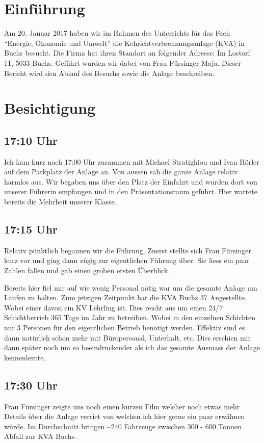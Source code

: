 \section{Einführung}
\label{sec-1}
Am 20. Januar 2017 haben wir im Rahmen des Unterrichts für das Fach
``Energie, Ökonomie und Umwelt'' die Kehrichtverbrennungsanlage (KVA) in
Buchs besucht. Die Firma hat ihren Standort an folgender Adresse: Im
Lostorf 11, 5033 Buchs.  Geführt wurden wir dabei von Frau Fürsinger
Maja.  Dieser Bericht wird den Ablauf des Besuchs sowie die Anlage
beschreiben.


\section{Besichtigung}
\label{sec-2}
\subsection{17:10 Uhr}
\label{sec-2-1}
Ich kam kurz nach 17:00 Uhr zusammen mit Michael Stratighiou und Ivan
Hörler auf dem Parkplatz der Anlage an. Von aussen sah die ganze
Anlage relativ harmlos aus. Wir begaben uns über den Platz der
Einfahrt und wurden dort von unserer Führerin empfangen und in den
Präsentationsraum geführt. Hier wartete bereits die Mehrheit unserer
Klasse.

\subsection{17:15 Uhr}
\label{sec-2-2}
Relativ pünktlich begannen wir die Führung. Zuerst stellte sich Frau
Fürsinger kurz vor und ging dann zügig zur eigentlichen Führung über.
Sie liess ein paar Zahlen fallen und gab einen groben ersten Überblick.

Bereits hier fiel mir auf wie wenig Personal nötig war um die gesamte
Anlage am Laufen zu halten. Zum jetzigen Zeitpunkt hat die KVA Buchs
37 Angestellte. Wobei einer davon ein KV Lehrling ist. Dies reicht aus
um einen 24/7 Schichtbetrieb 365 Tage im Jahr zu betreiben. Wobei in
den einzelnen Schichten nur 3 Personen für den eigentlichen Betrieb
benötigt werden. Effektiv sind es dann natürlich schon mehr mit
Büropersonal, Unterhalt, etc. Dies erschien mir dann später noch um so
beeindruckender als ich das gesamte Ausmass der Anlage kennenlernte.

\subsection{17:30 Uhr}
\label{sec-2-3}
Frau Fürsinger zeigte uns noch einen kurzen Film welcher noch etwas
mehr Details über die Anlage verriet von welchen ich hier gerne ein
paar erwähnen würde.  Im Durchschnitt bringen \textasciitilde{}240 Fahrzeuge zwischen
300 - 600 Tonnen Abfall zur KVA Buchs.

